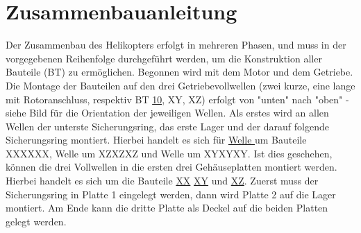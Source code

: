 \documentclass[11pt, a4paper]{scrartcl}
\newcommand*{\rom}[1]{\expandafter\uppercase\expandafter{\romannumeral #1 \relax}}
\begin{document}
\tableofcontents

\section{Zusammenbauanleitung\label{AnleitungMain}}

Der Zusammenbau des Helikopters erfolgt in mehreren Phasen, und muss in der vorgegebenen Reihenfolge durchgeführt werden, um die Konstruktion aller Bauteile (BT) zu ermöglichen. Begonnen wird mit dem Motor und dem Getriebe. Die Montage der Bauteilen auf den drei Getriebevollwellen (zwei kurze, eine lange mit Rotoranschluss, respektiv BT \hyperlink{Welle1}{10}, XY, XZ) erfolgt von "unten" nach "oben" - siehe Bild %
für die Orientation der jeweiligen Wellen. Als erstes wird an allen Wellen der unterste Sicherungsring, das erste Lager und der darauf folgende Sicherungsring montiert. Hierbei handelt es sich für \hyperlink{Welle1}{Welle \rom{1}} um Bauteile XXXXXX, Welle  \rom{2} um XZXZXZ und Welle \rom{3} um XYXYXY. Ist dies geschehen, können die drei Vollwellen in die ersten drei Gehäuseplatten montiert werden. Hierbei handelt es sich um die Bauteile \hyperlink{list_Platte1}{XX}
\hyperlink{list_Platte1}{XY} und \hyperlink{list_Platte1}{XZ}. Zuerst muss der Sicherungsring in Platte 1 eingelegt werden, dann wird Platte 2 auf die Lager montiert. Am Ende kann die dritte Platte als Deckel auf die beiden Platten gelegt werden. 
\end{document}
